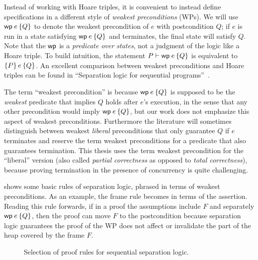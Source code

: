 Instead of working with Hoare triples, it is convenient to instead define
specifications in a different style of \emph{weakest preconditions} (WPs). We will use
$\wpre{e}{Q}$ to denote the weakest precondition of $e$ with postcondition $Q$;
if $e$ is run in a state satisfying $\wpre{e}{Q}$ and terminates, the final
state will satisfy $Q$. Note that the $\textsf{\upshape wp}$ is a \emph{predicate over
states}, not a judgment of the logic like a Hoare triple. To build intuition, the statement
$P \proves \wpre{e}{Q}$ is equivalent to $\hoare{P}{e}{Q}$. An excellent
comparison between weakest preconditions and Hoare triples can be found in
``Separation logic for sequential programs''~\cite{chargueraud:seq-seplogic}.

The term ``weakest precondition'' is because $\wpre{e}{Q}$ is supposed to be the
\emph{weakest} predicate that implies $Q$ holds after $e$'s execution, in the
sense that any other precondition would imply $\wpre{e}{Q}$, but our work does not
emphasize this aspect of weakest preconditions. Furthermore the literature will
sometimes distinguish between weakest \emph{liberal} preconditions that only guarantee
$Q$ if $e$ terminates and reserve the term weakest preconditions for a predicate
that also guarantees termination. This thesis uses the term weakest precondition for the
``liberal'' version (also called \emph{partial correctness} as opposed to
\emph{total correctness}), because proving termination in the presence of
concurrency is quite challenging.

 shows some basic rules of separation logic, phrased in terms of weakest preconditions.
As an example, the frame rule becomes
 in terms of the \wpw assertion. Reading this rule forwards, if in a proof
the assumptions include $F$
and separately $\wpre{e}{Q}$, then the proof can move $F$ to the postcondition because
separation logic guarantees the proof of the WP does not affect or invalidate
the part of the heap covered by the frame $F$.

\begin{figure}
\caption{Selection of proof rules for sequential separation logic.}
\label{fig:wp-rules}
\end{figure}

